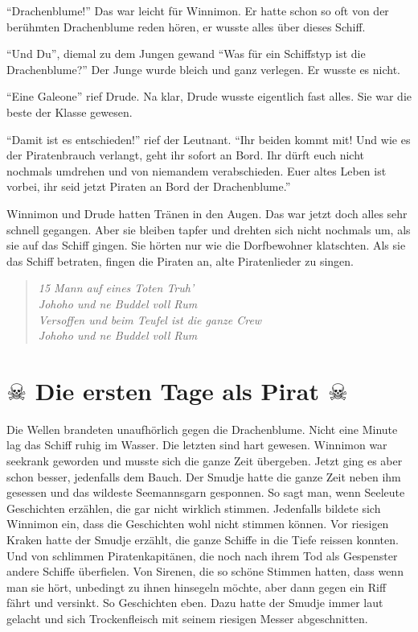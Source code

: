 \enquote{Drachenblume!} Das war leicht für Winnimon. Er hatte schon so oft von der berühmten Drachenblume reden hören, er wusste alles über dieses Schiff. 

\enquote{Und Du}, diemal zu dem Jungen gewand \enquote{Was für ein Schiffstyp ist die Drachenblume?} Der Junge wurde bleich und ganz verlegen. Er wusste es nicht.

\enquote{Eine Galeone} rief Drude. Na klar, Drude wusste eigentlich fast alles. Sie war die beste der Klasse gewesen. 

\enquote{Damit ist es entschieden!} rief der Leutnant. \enquote{Ihr beiden kommt mit! Und wie es der Piratenbrauch verlangt, geht ihr sofort an Bord. Ihr dürft euch nicht nochmals umdrehen und von niemandem verabschieden. Euer altes Leben ist vorbei, ihr seid jetzt Piraten an Bord der Drachenblume.}

Winnimon und Drude hatten Tränen in den Augen. Das war jetzt doch alles sehr schnell gegangen. Aber sie bleiben tapfer und drehten sich nicht nochmals um, als sie auf das Schiff gingen. Sie hörten nur wie die Dorfbewohner klatschten. Als sie das Schiff betraten, fingen die Piraten an, alte Piratenlieder zu singen.
\begin{verse}\it
15 Mann auf eines Toten Truh'\\
Johoho und ne Buddel voll Rum\\
Versoffen und beim Teufel ist die ganze Crew\\
Johoho und ne Buddel voll Rum\\
\end{verse}
\section*{\center $\skull$ Die ersten Tage als Pirat $\skull$}

Die Wellen brandeten unaufhörlich gegen die Drachenblume. Nicht eine Minute lag das Schiff ruhig im Wasser. Die letzten sind hart gewesen. Winnimon war seekrank geworden und musste sich die ganze Zeit übergeben. Jetzt ging es aber schon besser, jedenfalls dem Bauch. Der Smudje hatte die ganze Zeit neben ihm gesessen und das wildeste Seemannsgarn gesponnen. So sagt man, wenn Seeleute Geschichten erzählen, die gar nicht wirklich stimmen. Jedenfalls bildete sich Winnimon ein, dass die Geschichten wohl nicht stimmen können. Vor riesigen Kraken hatte der Smudje erzählt, die ganze Schiffe in die Tiefe reissen konnten. Und von schlimmen Piratenkapitänen, die noch nach ihrem Tod als Gespenster andere Schiffe überfielen. Von Sirenen, die so schöne Stimmen hatten, dass wenn man sie hört, unbedingt zu ihnen hinsegeln möchte, aber dann gegen ein Riff fährt und versinkt. So Geschichten eben. Dazu hatte der Smudje immer laut gelacht und sich Trockenfleisch mit seinem riesigen Messer abgeschnitten.

